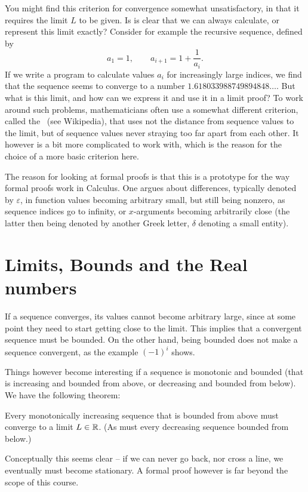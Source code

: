 \begin{note}
\label{cauchycrit}
You might find this criterion for convergence somewhat unsatisfactory, in
that it requires the limit $L$ to be given. Is is clear that we can always
calculate, or represent this limit exactly? Consider for example the
recursive sequence, defined by
\[
a_1=1,\qquad a_{i+1}=1+\frac{1}{a_i}.
\]
If we write a program to calculate values $a_i$ for increasingly large
indices, we find that the sequence seems to converge to a number
$1.618033988749894848\ldots$. But what is this limit, and how can we express it and use it in a limit proof?  To work
around such problems, mathematicians often use a somewhat different
criterion, called the~ (see Wikipedia), that uses
not the distance from sequence values to the limit, but of sequence values
never straying too far apart from each other. It however is a bit more
complicated to work with, which is the reason for the choice of a more basic
criterion here.
\end{note}

The reason for looking at formal proofs is that this is a prototype for the
way formal proofs work in Calculus. One argues about differences, typically denoted
by $\varepsilon$, in function values becoming arbitrary small, but still
being nonzero, as sequence indices go to infinity, or $x$-arguments becoming
arbitrarily close (the latter then being denoted by another Greek letter, 
$\delta$ denoting a small entity).

\section{Limits, Bounds and the Real numbers}

If a sequence converges, its values cannot become arbitrary large, since at some point
they need to start getting close to the limit. This implies that a convergent sequence
must be bounded.
On the other hand, being bounded does not make a sequence
convergent, as the example $(-1)^i$ shows.

Things however become interesting if a sequence is monotonic and bounded (that is
increasing and bounded from above, or decreasing and bounded from below). We have the
following theorem:
\begin{thm}
Every monotonically increasing sequence that is bounded from above must converge to a
limit $L\in{\mathbb R}$. (As must every decreasing sequence bounded from below.)
\end{thm}
Conceptually this seems clear -- if we can never go back, nor cross a line, we eventually
must become stationary. A formal proof however is far beyond the scope of this course.

